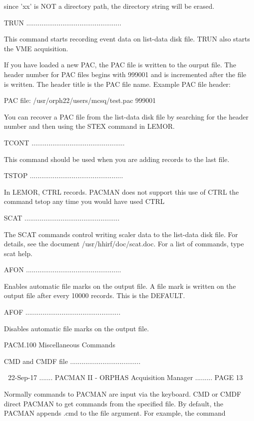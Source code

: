    since 'xx' is NOT a directory path, the directory string will be erased.
 
   TRUN ..................................................
 
   This  command starts recording event data on list-data disk file. TRUN also
   starts the VME acquisition.
 
   If you have loaded a new PAC, the PAC file is written to the  ourput  file.
   The  header  number  for  PAC  files  begins with 999001 and is incremented
   after the file is written.  The header title is the PAC file  name. Example
   PAC file header:
 
         PAC file: /usr/orph22/users/mcsq/test.pac         999001
 
   You  can  recover  a PAC file from the list-data disk file by searching for
   the header number and then using the STEX command in LEMOR.
 
   TCONT .................................................
 
   This command should be used when you are adding records to the last file.
 
   TSTOP .................................................
 
   In LEMOR, CTRL records.  PACMAN does  not  support  this  use  of  CTRL the
   command tstop any time you would have used CTRL
 
   SCAT ..................................................
 
   The  SCAT  commands control writing scaler data to the list-data disk file.
   For details, see the  document  /usr/hhirf/doc/scat.doc.   For  a  list  of
   commands, type scat help.
 
   AFON ..................................................
 
   Enables  automatic  file  marks on the output file.  A file mark is written
   on the output file after every 10000 records.  This is the DEFAULT.
 
   AFOF ..................................................
 
   Disables automatic file marks on the output file.
 
 
   PACM.100 Miscellaneous Commands
 
   CMD and CMDF file .....................................
 
    
   22-Sep-17 ....... PACMAN II - ORPHAS Acquisition Manager ......... PAGE  13
 
   Normally commands to PACMAN are  input  via  the  keyboard.   CMD  or  CMDF
   direct  PACMAN  to  get  commands from the specified file.  By default, the
   PACMAN appends .cmd to the file argument.  For example, the command
 
